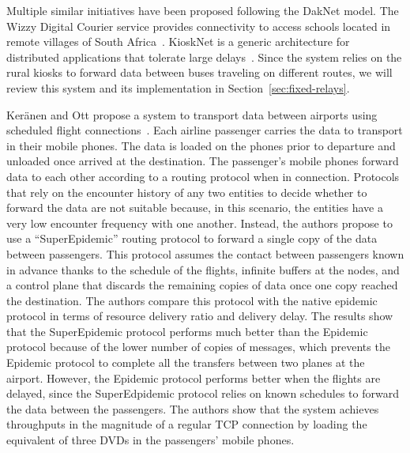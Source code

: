 Multiple similar initiatives have been proposed following the DakNet model. The Wizzy Digital Courier service provides connectivity to access schools located in remote villages of South Africa~\cite{rabagliati2004wizzy}. KioskNet is a generic architecture for distributed applications that tolerate large delays~\cite{seth2006low,guo2007very,guo2011design}. Since the system relies on the rural kiosks to forward data between buses traveling on different routes, we will review this system and its implementation in Section~\ref{sec:fixed-relays}.


Ker{\"a}nen and Ott propose a system to transport data between airports using scheduled flight connections~\cite{keranen2009dtn}. Each airline passenger carries the data to transport in their mobile phones. The data is loaded on the phones prior to departure and unloaded once arrived at the destination. The passenger's mobile phones forward data to each other according to a routing protocol when in connection. Protocols that rely on the encounter history of any two entities to decide whether to forward the data are not suitable because, in this scenario, the entities have a very low encounter frequency with one another. Instead, the authors propose to use a ``SuperEpidemic'' routing protocol to forward a single copy of the data between passengers. This protocol assumes the contact between passengers known in advance thanks to the schedule of the flights, infinite buffers at the nodes, and a control plane that discards the remaining copies of data once one copy reached the destination. The authors compare this protocol with the native epidemic protocol in terms of resource delivery ratio and delivery delay. The results show that the SuperEpidemic protocol performs much better than the Epidemic protocol because of the lower number of copies of messages, which prevents the Epidemic protocol to complete all the transfers between two planes at the airport. However, the Epidemic protocol performs better when the flights are delayed, since the SuperEdpidemic protocol relies on known schedules to forward the data between the passengers. The authors show that the system achieves throughputs in the magnitude of a regular TCP connection by loading the equivalent of three DVDs in the passengers' mobile phones. 

